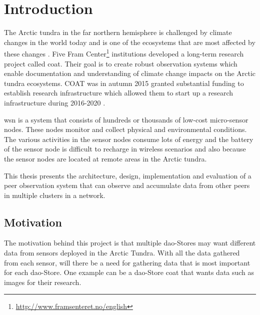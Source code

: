 \documentclass[USenglish]{uit-thesis}
\begin{document}
\tableofcontents


\listoflistings


\printacronyms


\mainmatter

\chapter{Introduction}
\glsresetall
The Arctic tundra in the far northern hemisphere is challenged by climate changes in the world today and is one of the ecosystems that are most affected by these changes \cite{coat2016}. Five Fram Center\footnote{\url{http://www.framsenteret.no/english}} institutions developed a long-term research project called \gls{coat}. Their goal is to create robust observation systems which enable documentation and understanding of climate change impacts on the Arctic tundra ecosystems. COAT was in autumn 2015 granted substantial funding to establish research infrastructure which allowed them to start up a research infrastructure during 2016-2020 \cite{coat2016}.

\gls{wsn} is a system that consists of hundreds or thousands of low-cost micro-sensor nodes. These nodes monitor and collect physical and environmental conditions. The various activities  in the sensor nodes consume lots of energy and the battery of the sensor node is difficult to recharge in wireless scenarios and also because the sensor nodes are located at remote areas in the Arctic tundra.



This thesis presents the architecture, design, implementation and evaluation of a peer observation system that can observe and accumulate data from other peers in multiple clusters in a network.


\section{Motivation}
The motivation behind this project is that multiple \gls{dao}-Stores \cite{dao} may want different data from sensors deployed in the Arctic Tundra. With all the data gathered from each sensor, will there be a need for gathering data that is most important for each \gls{dao}-Store. One example can be a \gls{dao}-Store \gls{coat} that wants data such as images for their research.
\end{document}
